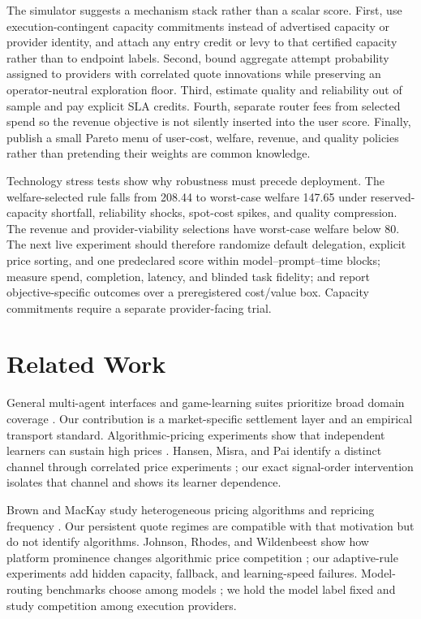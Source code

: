\documentclass[10pt]{article}
\newcommand{\1}{\mathbf 1}
\begin{document}
The simulator suggests a mechanism stack rather than a scalar score.  First,
use execution-contingent capacity commitments instead of advertised capacity or
provider identity, and attach any entry credit or levy to that certified
capacity rather than to endpoint labels.  Second, bound aggregate attempt probability assigned to
providers with correlated quote innovations while preserving an operator-neutral
exploration floor.  Third, estimate quality and reliability out of sample and
pay explicit SLA credits.  Fourth, separate router fees from selected spend so
the revenue objective is not silently inserted into the user score.  Finally,
publish a small Pareto menu of user-cost, welfare, revenue, and quality policies
rather than pretending their weights are common knowledge.

Technology stress tests show why robustness must precede deployment.  The
welfare-selected rule falls from 208.44 to worst-case welfare 147.65 under
reserved-capacity shortfall, reliability shocks, spot-cost spikes, and quality
compression.  The revenue and provider-viability selections have worst-case
welfare below 80.  The next live experiment should therefore randomize default
delegation, explicit price sorting, and one predeclared score within
model--prompt--time blocks; measure spend, completion, latency, and blinded task
fidelity; and report objective-specific outcomes over a preregistered cost/value
box.  Capacity commitments require a separate provider-facing trial.

\section{Related Work}

General multi-agent interfaces and game-learning suites prioritize broad domain
coverage \citep{terry2021pettingzoo,lanctot2019openspiel}.  Our contribution is a
market-specific settlement layer and an empirical transport standard.
Algorithmic-pricing experiments show that independent learners can sustain high
prices \citep{calvano2020}.  Hansen, Misra, and Pai identify a distinct channel
through correlated price experiments \citep{hansenmisrapai2021}; our exact
signal-order intervention isolates that channel and shows its learner dependence.

Brown and MacKay study heterogeneous pricing algorithms and repricing frequency
\citep{brownmackay2023}.  Our persistent quote regimes are compatible with that
motivation but do not identify algorithms.  Johnson, Rhodes, and Wildenbeest show
how platform prominence changes algorithmic price competition
\citep{johnsonrhodeswildenbeest2023}; our adaptive-rule experiments add hidden
capacity, fallback, and learning-speed failures.  Model-routing benchmarks choose
among models \citep{chen2023frugalgpt,ong2024routellm,hu2024routerbench}; we hold
the model label fixed and study competition among execution providers.
\end{document}
